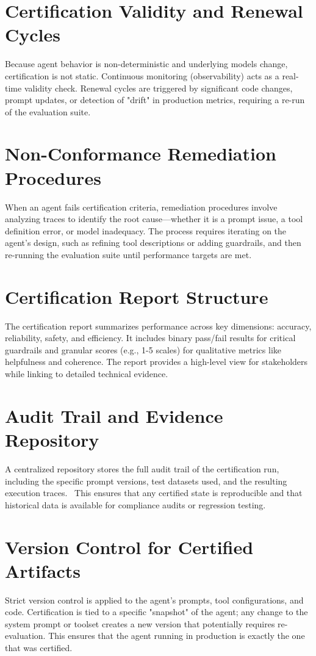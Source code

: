 \begin{TNtwocol}
\section{Certification Validity and Renewal Cycles}
Because agent behavior is non-deterministic and underlying models change, certification is not static. Continuous monitoring (observability) acts as a real-time validity check. Renewal cycles are triggered by significant code changes, prompt updates, or detection of "drift" in production metrics, requiring a re-run of the evaluation suite.~\cite{Mohammadi_2025}
\section{Non-Conformance Remediation Procedures}
When an agent fails certification criteria, remediation procedures involve analyzing traces to identify the root cause—whether it is a prompt issue, a tool definition error, or model inadequacy. The process requires iterating on the agent's design, such as refining tool descriptions or adding guardrails, and then re-running the evaluation suite until performance targets are met.
\section{Certification Report Structure}
The certification report summarizes performance across key dimensions: accuracy, reliability, safety, and efficiency. It includes binary pass/fail results for critical guardrails and granular scores (e.g., 1-5 scales) for qualitative metrics like helpfulness and coherence. The report provides a high-level view for stakeholders while linking to detailed technical evidence.
\section{Audit Trail and Evidence Repository}
A centralized repository stores the full audit trail of the certification run, including the specific prompt versions, test datasets used, and the resulting execution traces.~\cite{deepeval_ai_agent_evaluation} This ensures that any certified state is reproducible and that historical data is available for compliance audits or regression testing.
\section{Version Control for Certified Artifacts}
Strict version control is applied to the agent's prompts, tool configurations, and code. Certification is tied to a specific "snapshot" of the agent; any change to the system prompt or toolset creates a new version that potentially requires re-evaluation. This ensures that the agent running in production is exactly the one that was certified.

\end{TNtwocol}
